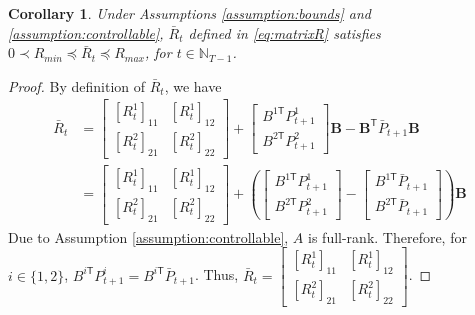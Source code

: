\documentclass[letterpaper, 10 pt, conference]{ieeeconf}  %
\newcommand{\transpose}{\mathsf{T}}
\newtheorem{corollary}{Corollary}
\begin{document}
\begin{corollary}\label{corollary:boundedR}
    Under Assumptions \ref{assumption:bounds} and \ref{assumption:controllable}, $\bar{R}_{t}$ defined in \eqref{eq:matrixR} satisfies $0 \prec R_{min} \preceq \bar{R}_{t} \preceq R_{max}$,
    for $t \in \mathbb{N}_{T-1}$.
\end{corollary}
\begin{proof}
    By definition of $\bar{R}_{t}$, we have
    \begin{align*}
        \bar{R}_{t} &= 
        \begin{bmatrix}
            [R_{t}^{1}]_{11} & [R_{t}^{1}]_{12}\\
            [R_{t}^{2}]_{21} & [R_{t}^{2}]_{22}
        \end{bmatrix}
        + 
        \begin{bmatrix}
            B^{1\transpose}P_{t+1}^{1}\\
            B^{2\transpose}P_{t+1}^{2}
        \end{bmatrix}\mathbf{B}
        - \mathbf{B}^{\transpose}\bar{P}_{t+1}\mathbf{B}\\
        &= \begin{bmatrix}
            [R_{t}^{1}]_{11} & [R_{t}^{1}]_{12}\\
            [R_{t}^{2}]_{21} & [R_{t}^{2}]_{22}
        \end{bmatrix}
        + 
        (\begin{bmatrix}
            B^{1\transpose}P_{t+1}^{1}\\
            B^{2\transpose}P_{t+1}^{2}
        \end{bmatrix}-
        \begin{bmatrix}
            B^{1\transpose}\bar{P}_{t+1}\\
            B^{2\transpose}\bar{P}_{t+1}
        \end{bmatrix}
        )\mathbf{B}
    \end{align*}
    Due to Assumption \ref{assumption:controllable}, $A$ is full-rank. Therefore, for $i \in \{1,2\}$,
        $B^{i\transpose}P_{t+1}^{i} = B^{i\transpose}\bar{P}_{t+1}$.
    Thus,
        $\bar{R}_{t} = 
        \begin{bmatrix}
            [R_{t}^{1}]_{11} & [R_{t}^{1}]_{12}\\
            [R_{t}^{2}]_{21} & [R_{t}^{2}]_{22}
        \end{bmatrix}$.

\end{proof}
\end{document}
